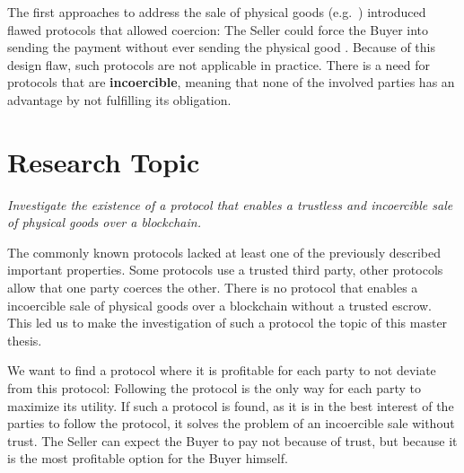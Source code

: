 \documentclass{cacthesis}
\begin{document}
	The first approaches to address the sale of physical goods (e.g.~\cite{zimbeck_two_nodate}) introduced flawed protocols that allowed coercion: The Seller could force the Buyer into sending the payment without ever sending the physical good \cite{goharshady_irrationality_2021}. Because of this design flaw, such protocols are not applicable in practice. There is a need for protocols that are \textbf{incoercible}, meaning that none of the involved parties has an advantage by not fulfilling its obligation.\newline
	
	
	\section{Research Topic}

	\emph{Investigate the existence of a protocol that enables a trustless and incoercible sale of physical goods over a blockchain.}\newline
	
    The commonly known protocols lacked at least one of the previously described important properties. Some protocols use a trusted third party, other protocols allow that one party coerces the other. There is no protocol that enables a incoercible sale of physical goods over a blockchain without a trusted escrow. This led us to make the investigation of such a protocol the topic of this master thesis.\newline
    

 We want to find a protocol where it is profitable for each party to not deviate from this protocol: Following the protocol is the only way for each party to maximize its utility.
If such a protocol is found, as it is in the best interest of the parties to follow the protocol, it solves the problem of an incoercible sale without trust. The Seller can expect the Buyer to pay not because of trust, but because it is the most profitable option for the Buyer himself. \newline 
\end{document}
